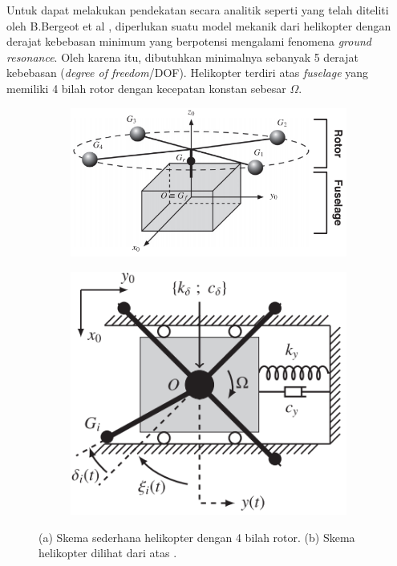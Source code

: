 Untuk dapat melakukan pendekatan secara analitik seperti yang telah diteliti oleh B.Bergeot et al \cite{BERGEOT201672}, diperlukan suatu model mekanik dari helikopter dengan derajat kebebasan minimum yang berpotensi mengalami fenomena \textit{ground resonance}. Oleh karena itu, dibutuhkan minimalnya sebanyak 5 derajat kebebasan (\textit{degree of freedom}/DOF). Helikopter terdiri atas \textit{fuselage} yang memiliki 4 bilah rotor dengan kecepatan konstan sebesar $\Omega$.

\begin{figure}[H]
	\centering 
	\begin{subfigure}{0.5\textwidth}
		\centering
		\includegraphics[width=\linewidth]{gambar/rotor_fuselage.png}
		\caption{}
		\label{fig:rotorfuselage}
	\end{subfigure}
	\centering
	\begin{subfigure}{0.35\textwidth}
		\centering
		\includegraphics[width=\linewidth]{gambar/rotor_fuselage_topview.png}
		\caption{}
		\label{fig:topviewrotorfuslage}
	\end{subfigure}
	\caption{(a) Skema sederhana helikopter dengan 4 bilah rotor. (b) Skema helikopter dilihat dari atas \cite{BERGEOT201672}.}
	\label{fig:simplifiedmodel}
\end{figure}

